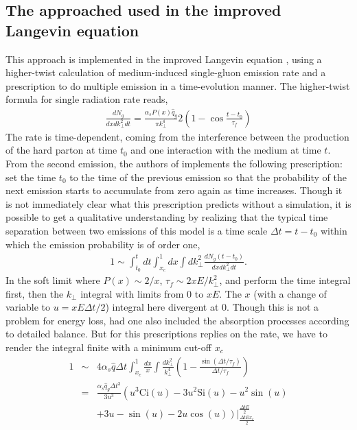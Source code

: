 \documentclass[aps, prc, reprint, amsmath, groupedaddress, nofootinbib]{revtex4-1}
\begin{document}
\subsection{The approached used in the improved Langevin equation}
This approach is implemented in the improved Langevin equation \cite{Cao:2013ita}, using a higher-twist calculation of medium-induced single-gluon emission rate and a prescription to do multiple emission in a time-evolution manner.
The higher-twist formula for single radiation rate reads,
\begin{eqnarray}
\frac{dN_g}{dx dk_\perp^2 dt} = \frac{\alpha_s P(x)\hat{q}_g}{\pi k_\perp^4} 2\left(1-\cos\frac{t-t_0}{\tau_f}\right)
\end{eqnarray}
The rate is time-dependent, coming from the interference between the production of the hard parton at time $t_0$ and one interaction with the medium at time $t$.
From the second emission, the authors of \cite{Cao:2013ita} implements the following prescription: set the time $t_0$ to the time of the previous emission so that the probability of the next emission starts to accumulate from zero again as time increases.
Though it is not immediately clear what this prescription predicts without a simulation, it is possible to get a qualitative understanding by realizing that the typical time separation between two emissions of this model is a time scale $\Delta t = t-t_0$ within which the emission probability is of order one,
\begin{eqnarray}
1 \sim \int_{t_0}^{t} dt\int_{x_c}^1 dx \int dk_\perp^2 \frac{dN_g(t-t_0)}{dx dk_\perp^2 dt}.
\end{eqnarray}
In the soft limit where $P(x) \sim 2/x$, $\tau_f\sim 2xE/k_\perp^2$, and perform the time integral first, then the $k_\perp$ integral with limits from $0$ to $xE$.
The $x$ (with a change of variable to $u = xE\Delta t/2$) integral here divergent at 0.
Though this is not a problem for energy loss, had one also included the absorption processes according to detailed balance.
But for this prescriptions replies on the rate, we have to render the integral finite with a minimum cut-off $x_c$
\begin{eqnarray}
1 &\sim& 4\alpha_s\hat{q}\Delta t \int_{x_c}^1 \frac{dx}{x} \int \frac{dk_\perp^2}{k_\perp^4}\left(1-\frac{\sin(\Delta t/\tau_f)}{\Delta t/\tau_f}\right)\\
&=& \frac{\alpha_s\hat{q}_g \Delta t^3}{3u^3} \left( u^3\mathrm{Ci}(u)-3u^2\mathrm{Si}(u) - u^2 \sin(u) \right. \\\nonumber
&&\left. +3u-\sin(u) - 2u\cos(u) \right) \left.\right|_{\frac{\Delta t E x_c}{2}}^{\frac{\Delta t E}{2}} 
\end{eqnarray}
\end{document}
